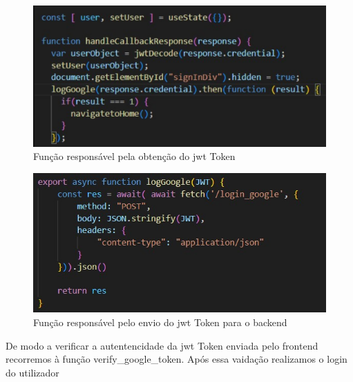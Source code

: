  \begin{figure}[H]
      \centering
      \includegraphics[width=16cm]{images/google_login_front.png}
      \caption{Função responsável pela obtenção do \ac{jwt} Token}
      \label{fig:login_google}
    \end{figure}

 \begin{figure}[H]
      \centering
      \includegraphics[width=16cm]{images/call_login_google.jpg}
      \caption{Função responsável pelo envio do \ac{jwt} Token para o backend}
      \label{fig:login_google}
    \end{figure}

De modo a verificar a autentencidade da \ac{jwt} Token enviada pelo frontend recorremos à função verify\_google\_token.
Após essa vaidação realizamos o login do utilizador

